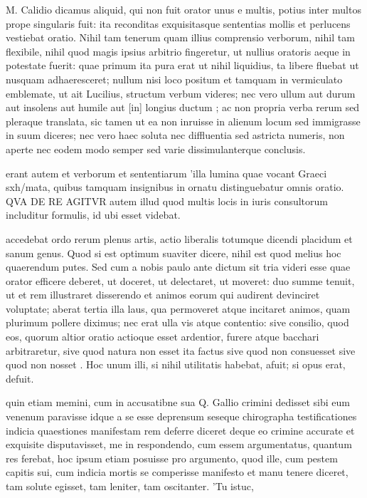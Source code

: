  M. Calidio dicamus aliquid, qui non fuit orator unus e multis, potius inter multos prope singularis fuit: ita reconditas exquisitasque sententias mollis et perlucens vestiebat oratio. Nihil tam tenerum quam illius comprensio verborum, nihil tam flexibile, nihil quod magis ipsius arbitrio fingeretur, ut nullius oratoris aeque in potestate fuerit: quae primum ita pura erat ut nihil liquidius, ta libere fluebat ut nusquam adhaeresceret; nullum nisi loco positum et tamquam in vermiculato emblemate, ut ait Lucilius, structum verbum videres; nec vero ullum aut durum aut insolens aut humile aut [in] longius ductum ; ac non propria verba rerum sed pleraque translata, sic tamen ut ea non inruisse in alienum locum sed immigrasse in suum diceres; nec vero haec soluta nec diffluentia sed astricta numeris, non aperte nec eodem modo semper sed varie dissimulanterque conclusis.

 erant autem et verborum et sententiarum 'illa lumina quae vocant Graeci sxh/mata, quibus tamquam insignibus in ornatu distinguebatur omnis oratio. QVA DE RE AGITVR autem illud quod multis locis in iuris consultorum includitur formulis, id ubi esset videbat.

 accedebat ordo rerum plenus artis, actio liberalis totumque dicendi placidum et sanum genus. Quod si est optimum suaviter dicere, nihil est quod melius hoc quaerendum putes. Sed cum a nobis paulo ante dictum sit tria videri esse quae orator efficere deberet, ut doceret, ut delectaret, ut moveret: duo summe tenuit, ut et rem illustraret disserendo et animos eorum qui audirent devinciret voluptate; aberat tertia illa laus, qua permoveret atque incitaret animos, quam plurimum pollere diximus; nec erat ulla vis atque contentio: sive consilio, quod eos, quorum altior oratio actioque esset ardentior, furere atque bacchari arbitraretur, sive quod natura non esset ita factus sive quod non consuesset sive quod non nosset . Hoc unum illi, si nihil utilitatis habebat, afuit; si opus erat, defuit.

 quin etiam memini, cum in accusatibne sua Q. Gallio crimini dedisset sibi eum venenum paravisse idque a se esse deprensum seseque chirographa testificationes indicia quaestiones manifestam rem deferre diceret deque eo crimine accurate et exquisite disputavisset, me in respondendo, cum essem argumentatus, quantum res ferebat, hoc ipsum etiam posuisse pro argumento, quod ille, cum pestem capitis sui, cum indicia mortis se comperisse manifesto et manu tenere diceret, tam solute egisset, tam leniter, tam oscitanter. 'Tu istuc,

